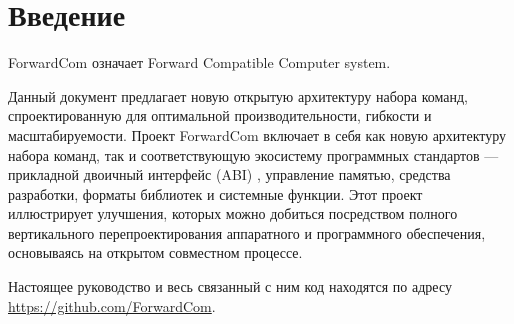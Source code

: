 \documentclass[forwardcom.tex]{subfiles}
\begin{document}

\chapter{Введение}
ForwardCom означает Forward Compatible Computer system. 

Данный документ предлагает новую открытую архитектуру набора команд, спроектированную для оптимальной производительности, гибкости и масштабируемости.
Проект ForwardCom включает в себя как новую архитектуру набора команд, так и соответствующую экосистему программных стандартов --- прикладной двоичный 
интерфейс (ABI) , управление памятью, средства разработки, форматы библиотек и системные функции. Этот проект иллюстрирует улучшения, которых можно 
добиться посредством полного вертикального перепроектирования аппаратного и программного обеспечения, основываясь на открытом совместном процессе.

Настоящее руководство и весь связанный с ним код находятся по адресу \href{https://github.com/ForwardCom/}{https://github.com/ForwardCom}.
 
\end{document}
